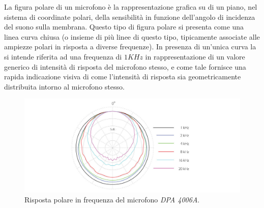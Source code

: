 La figura polare di un microfono è la rappresentazione grafica su di un piano,
nel sistema di coordinate polari, della sensibilità in funzione dell'angolo di
incidenza del suono sulla membrana. Questo tipo di figura polare si presenta
come una linea curva chiusa (o insieme di più linee di questo tipo, tipicamente
associate alle ampiezze polari in risposta a diverse frequenze). In presenza di
un’unica curva la si intende riferita ad una frequenza di $1KHz$ in rappresentazione
di un valore generico di intensità di risposta del microfono stesso,
e come tale fornisce una rapida indicazione visiva di come l'intensità di
risposta sia geometricamente distribuita intorno
al microfono stesso.

\begin{figure}[h]
\centering
\includegraphics[width=0.99\columnwidth]{CAPITOLI/1000/IMG/4006A-ddicate-4006A-Omni-Microphone-polar-pattern.jpg}
\caption{Risposta polare in frequenza del microfono \emph{DPA 4006A}.}%
\label{pol:dpa4006}
\end{figure}

